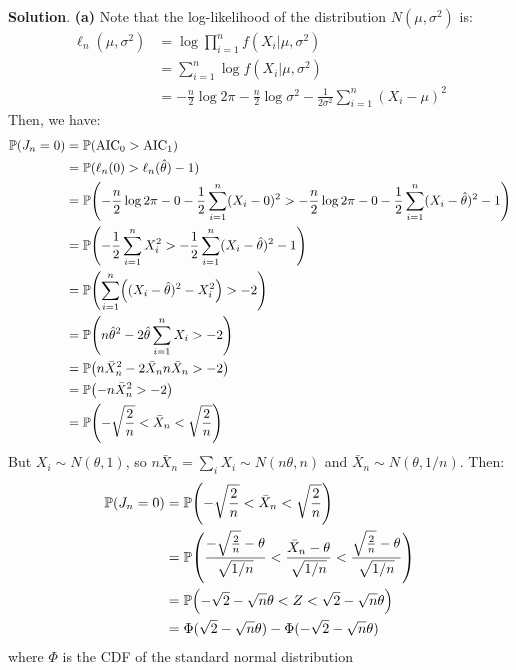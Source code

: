 \textbf{Solution}.
\textbf{(a)} Note that the log-likelihood of the distribution
\(N(\mu, \sigma^{2})\) is:
\begin{align*}
\ell_{n}(\mu, \sigma^{2}) &= \log \prod_{i=1}^{n} f(X_{i} | \mu, \sigma^{2}) \\
&= \sum_{i=1}^{n} \log f(X_{i} | \mu, \sigma^{2}) \\
&= - \frac{n}{2} \log 2\pi - \frac{n}{2} \log \sigma^{2} - \frac{1}{2\sigma^{2}} \sum_{i=1}^{n} (X_{i} - \mu)^{2}
\end{align*}
Then, we have:
\begin{align*}
\PROB(J_{n} = 0) &= \PROB(\text{AIC}_{0} > \text{AIC}_{1}) \\
&= \PROB(\ell_{n}(0) > \ell_{n}(\hat{\theta}) - 1) \\
&= \PROB \left(-\frac{n}{2} \log 2\pi - 0 - \frac{1}{2} \sum_{i=1}^{n} (X_{i} - 0)^{2} > -\frac{n}{2} \log 2\pi - 0 - \frac{1}{2} \sum_{i=1}^{n} (X_{i} - \hat{\theta})^{2} - 1 \right) \\
&= \PROB\left( -\frac{1}{2} \sum_{i=1}^{n} X_{i}^{2} > -\frac{1}{2} \sum_{i=1}^{n} (X_{i} - \hat{\theta})^{2} - 1\right) \\
&= \PROB\left( \sum_{i=1}^{n} \left((X_{i} - \hat{\theta})^{2} - X_{i}^{2} \right) > -2 \right) \\
&= \PROB\left( n \hat{\theta}^{2} - 2 \hat{\theta} \sum_{i=1}^{n} X_{i} > -2 \right) \\
&= \PROB\left( n \bar{X}_{n}^{2} - 2 \bar{X}_{n} n \bar{X}_{n} > -2\right) \\
&= \PROB\left( -n \bar{X}_{n}^{2} > -2 \right) \\
&= \PROB\left(-\sqrt{\frac{2}{n}} < \bar{X}_{n} < \sqrt{\frac{2}{n}} \right)
\end{align*}
But \(X_{i} \sim N(\theta, 1)\), so
\(n \bar{X}_{n} = \sum_{i} X_{i} \sim N(n\theta, n)\) and
\(\bar{X}_{n} \sim N(\theta, 1/n)\). Then:
\begin{align*}
\PROB(J_{n} = 0) &= \PROB\left(-\sqrt{\frac{2}{n}} < \bar{X}_{n} < \sqrt{\frac{2}{n}} \right) \\
&= \PROB\left(\frac{-\sqrt{\frac{2}{n}} - \theta}{\sqrt{1/n}} < \frac{\bar{X}_{n} - \theta}{\sqrt{1/n}} < \frac{\sqrt{\frac{2}{n}} - \theta}{\sqrt{1/n}} \right) \\
&= \PROB\left(-\sqrt{2} - \sqrt{n}\theta < Z < \sqrt{2} - \sqrt{n}\theta \right) \\
&= \Phi(\sqrt{2} - \sqrt{n}\theta) - \Phi(-\sqrt{2} - \sqrt{n}\theta)
\end{align*}
where \(\Phi\) is the CDF of the standard normal distribution

